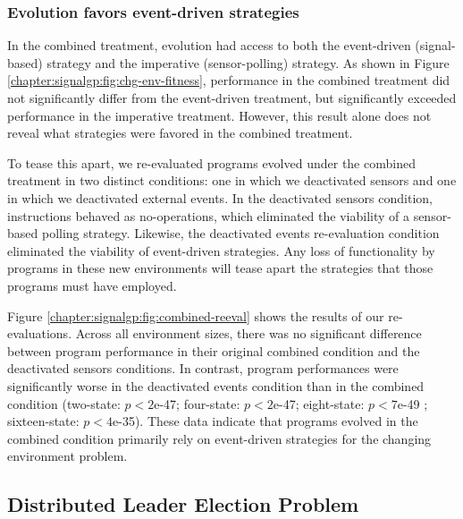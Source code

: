 \subsubsection{Evolution favors event-driven strategies}

In the combined treatment, evolution had access to both the event-driven (signal-based) strategy and the imperative (sensor-polling) strategy. 
As shown in Figure \ref{chapter:signalgp:fig:chg-env-fitness}, performance in the combined treatment did not significantly differ from the event-driven treatment, but significantly exceeded performance in the imperative treatment. 
However, this result alone does not reveal what strategies were favored in the combined treatment. 

To tease this apart, we re-evaluated programs evolved under the combined treatment in two distinct conditions:
one in which we deactivated sensors and one in which we deactivated external events. 
In the deactivated sensors condition,  instructions behaved as no-operations, which eliminated the viability of a sensor-based polling strategy.
Likewise, the deactivated events re-evaluation condition eliminated the viability of event-driven strategies.  
Any loss of functionality by programs in these new environments will tease apart the strategies that those programs must have employed.



Figure \ref{chapter:signalgp:fig:combined-reeval} shows the results of our re-evaluations. 
Across all environment sizes, there was no significant difference between program performance in their original combined condition and the deactivated sensors conditions. 
In contrast, program performances were significantly worse in the deactivated events condition than in the combined condition (two-state: $p<2$e-47; four-state: $p<2$e-47; eight-state: $p<7$e-49 ; sixteen-state: $p<4$e-35). 
These data indicate that programs evolved in the combined condition primarily rely on event-driven strategies for the changing environment problem. 

\subsection{Distributed Leader Election Problem}



